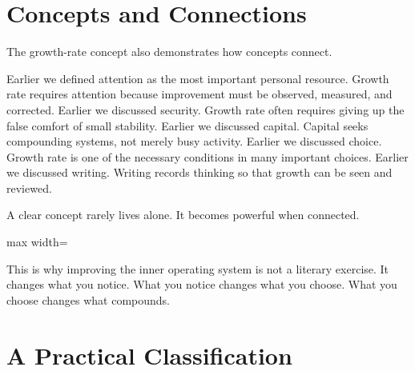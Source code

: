 \section*{Concepts and Connections}

The growth-rate concept also demonstrates how concepts connect.

Earlier we defined attention as the most important personal resource. Growth rate requires attention because improvement must be observed, measured, and corrected. Earlier we discussed security. Growth rate often requires giving up the false comfort of small stability. Earlier we discussed capital. Capital seeks compounding systems, not merely busy activity. Earlier we discussed choice. Growth rate is one of the necessary conditions in many important choices. Earlier we discussed writing. Writing records thinking so that growth can be seen and reviewed.

A clear concept rarely lives alone. It becomes powerful when connected.

\begin{center}
\begin{adjustbox}{max width=\linewidth}
\end{adjustbox}
\end{center}

This is why improving the inner operating system is not a literary exercise. It changes what you notice. What you notice changes what you choose. What you choose changes what compounds.

\section*{A Practical Classification}


